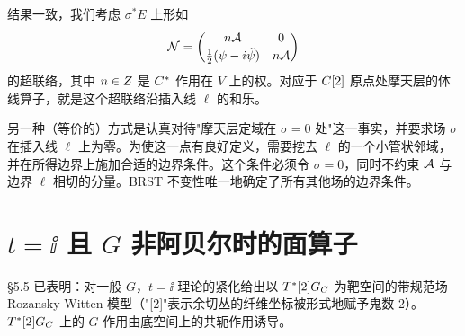 
结果一致，我们考虑 $\sigma^*E$ 上形如
\[
\mathcal{N}=\begin{pmatrix}
n\mathcal{A} & 0\\[2pt]
\frac{1}{2}(\psi-i\tilde\psi) & n\mathcal{A}
\end{pmatrix}
\]
的超联络，其中 $n\in Z$ 是 $C^*$ 作用在 $V$ 上的权。对应于 $C[2]$ 原点处摩天层的体线算子，就是这个超联络沿插入线 $\ell$ 的和乐。

另一种（等价的）方式是认真对待"摩天层定域在 $\sigma=0$ 处"这一事实，并要求场 $\sigma$ 在插入线 $\ell$ 上为零。为使这一点有良好定义，需要挖去 $\ell$ 的一个小管状邻域，并在所得边界上施加合适的边界条件。这个条件必须令 $\sigma=0$，同时不约束 $\mathcal{A}$ 与边界 $\ell$ 相切的分量。BRST 不变性唯一地确定了所有其他场的边界条件。


\section{\texorpdfstring{$t=\ii$}{t=i} 且 \texorpdfstring{$G$}{G} 非阿贝尔时的面算子}

§5.5 已表明：对一般 $G$，$t=\ii$ 理论的紧化给出以 $T^*[2]G_C$ 为靶空间的带规范场 Rozansky-Witten 模型（"[2]"表示余切丛的纤维坐标被形式地赋予鬼数 2）。$T^*[2]G_C$ 上的 $G$-作用由底空间上的共轭作用诱导。



